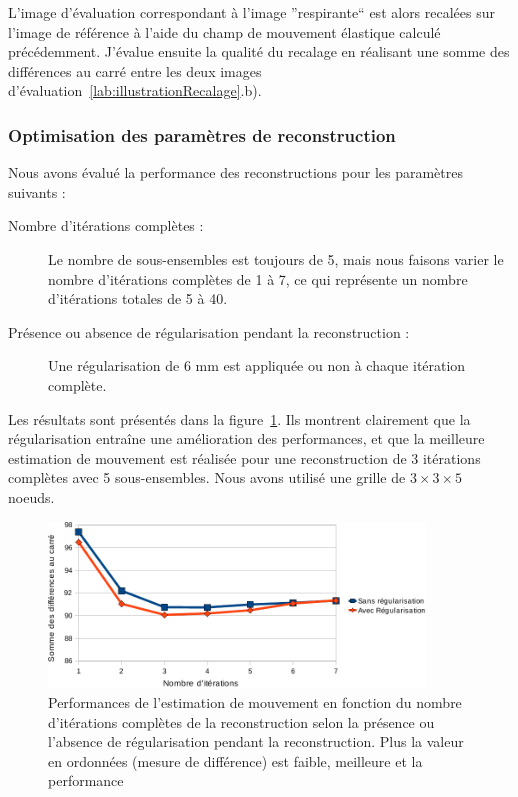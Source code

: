 L'image d'évaluation correspondant à l'image ''respirante`` est alors recalées sur l'image de référence à l'aide du champ de mouvement élastique calculé précédemment. J'évalue ensuite la qualité du recalage en réalisant une somme des différences au carré entre les deux images d'évaluation~\ref{lab:illustrationRecalage}.b).


\subsubsection{Optimisation des paramètres de reconstruction}

Nous avons évalué la performance des reconstructions pour les paramètres suivants :
\begin{description}
 \item[Nombre d'itérations complètes :] Le nombre de sous-ensembles est toujours de 5, mais nous faisons varier le nombre d'itérations complètes de 1 à 7, ce qui représente un nombre d'itérations totales de 5 à 40.
 \item[Présence ou absence de régularisation pendant la reconstruction :] Une régularisation de 6 mm  est appliquée ou non à chaque itération complète.
\end{description}

Les résultats sont présentés dans la figure~\ref{lab:perfsFctIterReg}. Ils montrent clairement que la régularisation entraîne une amélioration des performances, et que la meilleure estimation de mouvement est réalisée pour une reconstruction de 3 itérations complètes avec 5 sous-ensembles. Nous avons utilisé une grille de $3 \times 3 \times 5$ noeuds.

\begin{figure}
\centering
\includegraphics[width=10cm]{images/perfsRecalageFctIter_crop}
\caption[Performances de l'estimation de mouvement en fonction de la régularisation]{Performances de l'estimation de mouvement en fonction du nombre d'itérations complètes de la reconstruction selon la présence ou l'absence de régularisation pendant la reconstruction. Plus la valeur en ordonnées (mesure de différence) est faible, meilleure et la performance}
\label{lab:perfsFctIterReg}
\end{figure}

